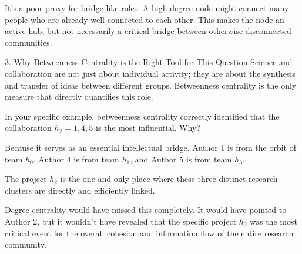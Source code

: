 \documentclass[11pt, a4paper]{article}
\begin{document}
{It's a poor proxy for bridge-like roles: A high-degree node might connect many people who are already well-connected to each other. This makes the node an active hub, but not necessarily a critical bridge between otherwise disconnected communities.

3. Why Betweenness Centrality is the Right Tool for This Question
Science and collaboration are not just about individual activity; they are about the synthesis and transfer of ideas between different groups. Betweenness centrality is the only measure that directly quantifies this role.

In your specific example, betweenness centrality correctly identified that the collaboration $h_2=1,4,5$ is the most influential. Why?

Because it serves as an essential intellectual bridge. Author 1 is from the orbit of team $h_0$, Author 4 is from team $h_1$, and Author 5 is from team $h_3$.

The project $h_2$ is the one and only place where these three distinct research clusters are directly and efficiently linked.

Degree centrality would have missed this completely. It would have pointed to Author 2, but it wouldn't have revealed that the specific project $h_2$ was the most critical event for the overall cohesion and information flow of the entire research community.


}
\end{document}
